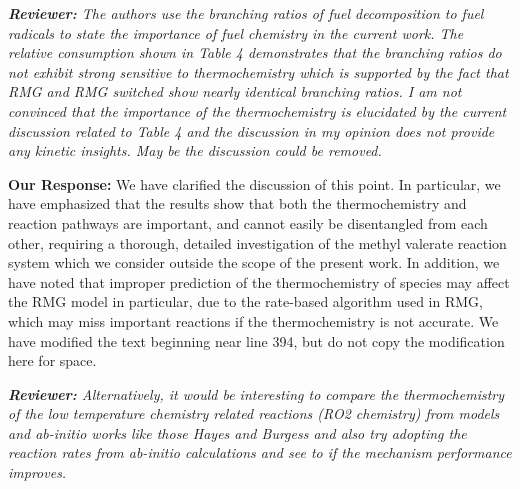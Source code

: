 \documentclass{article}
\newenvironment{reviewer}{\vspace{0.5\baselineskip}\begingroup\itshape\textbf{Reviewer:}}{\endgroup\vspace{0.5\baselineskip}}
\newenvironment{response}{\vspace{0.5\baselineskip}\textbf{Our Response:}}{\vspace{0.5\baselineskip}}
\begin{document}
\begin{reviewer}
    The authors use the branching ratios of fuel decomposition to fuel radicals to state the
    importance of fuel chemistry in the current work. The relative consumption shown in Table 4
    demonstrates that the branching ratios do not exhibit strong sensitive to thermochemistry which
    is supported by the fact that RMG and RMG switched show nearly identical branching ratios. I am
    not convinced that the importance of the thermochemistry is elucidated by the current discussion
    related to Table 4 and the discussion in my opinion does not provide any kinetic insights. May
    be the discussion could be removed.
\end{reviewer}

\begin{response}
    We have clarified the discussion of this point. In particular, we have emphasized that the
    results show that both the thermochemistry and reaction pathways are important, and cannot
    easily be disentangled from each other, requiring a thorough, detailed investigation of the
    methyl valerate reaction system which we consider outside the scope of the present work. In
    addition, we have noted that improper prediction of the thermochemistry of species may affect
    the RMG model in particular, due to the rate-based algorithm used in RMG, which may miss
    important reactions if the thermochemistry is not accurate. We have modified the text beginning
    near line 394, but do not copy the modification here for space.
\end{response}

\begin{reviewer}
    Alternatively, it would be interesting to compare the thermochemistry of the low temperature
    chemistry related reactions (RO2 chemistry) from models and ab-initio works like those Hayes and
    Burgess and also try adopting the reaction rates from ab-initio calculations and see to if the
    mechanism performance improves.
\end{reviewer}
\end{document}
